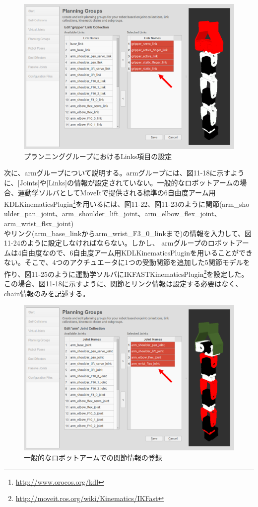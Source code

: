 \begin{figure}[htp]
  \centering
  \includegraphics[width=12cm]{pictures/chapter11/pic_11_21.png}
  \caption{プランニンググループにおけるLinks項目の設定}
\end{figure}

次に、armグループについて説明する。armグループには、図11-18に示すように、[Joints]や[Links]の情報が設定されていない。一般的なロボットアームの場合、運動学ソルバとしてMoveItで提供される標準の6自由度アーム用KDLKinematicsPlugin\footnote{\url{http://www.orocos.org/kdl}}を用いるには、図11-22、図11-23のように関節(arm\_sho\\ulder\_pan\_joint、arm\_shoulder\_lift\_joint、arm\_elbow\_flex\_joint、arm\_wrist\_flsx\_joint)\\やリンク(arm\_base\_linkからarm\_wrist\_F3\_0\_linkまで)の情報を入力して、図11-24のように設定しなければならない。しかし、 armグループのロボットアームは4自由度なので、6自由度アーム用KDLKinematicsPluginを用いることができない。そこで、4つのアクチュエータに1つの受動関節を追加した5関節モデルを作り、図11-25のように運動学ソルバにIKFASTKinematicsPlugin\footnote{\url{http://moveit.ros.org/wiki/Kinematics/IKFast}}を設定した。この場合、図11-18に示すように、関節とリンク情報は設定する必要はなく、chain情報のみを記述する。

\begin{figure}[htp]
  \centering
  \includegraphics[width=12cm]{pictures/chapter11/pic_11_22.png}
  \caption{一般的なロボットアームでの関節情報の登録}
\end{figure}

